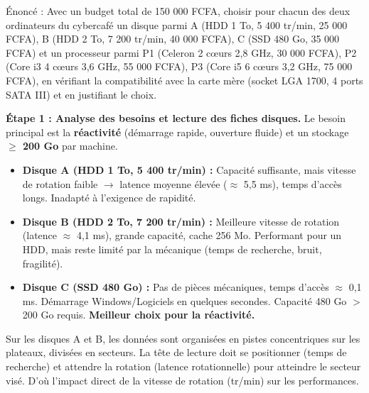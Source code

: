 \documentclass[11pt]{article}
\newcommand{\cle}[1]{{\popxbold\color{popdark}#1}}
\begin{document}
\begin{exoresolu}
Énoncé : Avec un budget total de 150 000 FCFA, choisir pour chacun des deux ordinateurs du cybercafé un disque parmi A (HDD 1 To, 5 400 tr/min, 25 000 FCFA), B (HDD 2 To, 7 200 tr/min, 40 000 FCFA), C (SSD 480 Go, 35 000 FCFA) et un processeur parmi P1 (Celeron 2 cœurs 2,8 GHz, 30 000 FCFA), P2 (Core i3 4 cœurs 3,6 GHz, 55 000 FCFA), P3 (Core i5 6 cœurs 3,2 GHz, 75 000 FCFA), en vérifiant la compatibilité avec la carte mère (socket LGA 1700, 4 ports SATA III) et en justifiant le choix.

\tcblower

\textbf{Étape 1 : Analyse des besoins et lecture des fiches disques.}
Le besoin principal est la \textbf{réactivité} (démarrage rapide, ouverture fluide) et un stockage \textbf{$\ge$ 200 Go} par machine.
\begin{itemize}
\item \textbf{Disque A (HDD 1 To, 5 400 tr/min) :} Capacité suffisante, mais vitesse de rotation faible $\rightarrow$ latence moyenne élevée ($\approx$ 5,5 ms), temps d'accès longs. Inadapté à l'exigence de rapidité.
\item \textbf{Disque B (HDD 2 To, 7 200 tr/min) :} Meilleure vitesse de rotation (latence $\approx$ 4,1 ms), grande capacité, cache 256 Mo. Performant pour un HDD, mais reste limité par la mécanique (temps de recherche, bruit, fragilité).
\item \textbf{Disque C (SSD 480 Go) :} Pas de pièces mécaniques, temps d'accès $\approx$ 0,1 ms. Démarrage Windows/Logiciels en quelques secondes. Capacité 480 Go $>$ 200 Go requis. \textbf{Meilleur choix pour la réactivité.}
\end{itemize}
Sur les disques A et B, les données sont organisées en \cle{pistes} concentriques sur les plateaux, divisées en \cle{secteurs}. La tête de lecture doit se positionner (temps de recherche) et attendre la rotation (latence rotationnelle) pour atteindre le secteur visé. D'où l'impact direct de la vitesse de rotation (tr/min) sur les performances.


\end{exoresolu}
\end{document}
